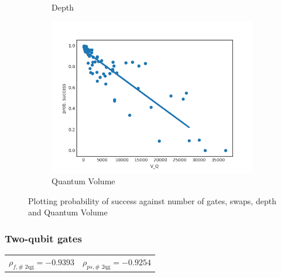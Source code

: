 \documentclass[11pt]{article}
\begin{document}
\begin{figure}[H]
\begin{subfigure}[b]{0.5\linewidth}
    \caption{Depth} 
    \label{fig:ps_d_3000} 
  \end{subfigure}%
  \begin{subfigure}[b]{0.5\linewidth}
    \centering
    \includegraphics[width=0.75\linewidth]{ps_q_3000_0_005} 
    \caption{Quantum Volume} 
    \label{fig:ps_q_3000} 
  \end{subfigure} 
  \caption{Plotting probability of success against number of gates, swaps, depth and Quantum Volume}
  \label{fig:ps_3000} 
\end{figure}




\subsubsection{Two-qubit gates}
\label{sec:org6d465c5}

\begin{center}
\begin{tabular}{ll}
\(\rho _{f,\text{# 2qg}} = -0.9393\) & \(\rho _{ps,\text{# 2qg}} = -0.9254\)\\
\end{tabular}
\end{center}
\end{document}
